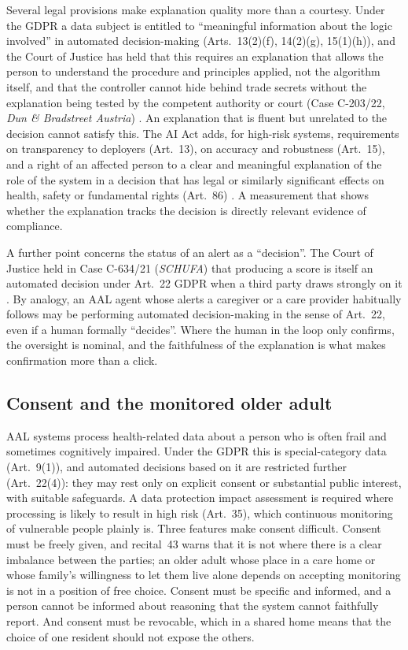 \documentclass[11pt,a4paper]{article}
\begin{document}
Several legal provisions make explanation quality more than a courtesy. Under the GDPR a data subject is entitled to ``meaningful information about the logic involved'' in automated decision-making (Arts.~13(2)(f), 14(2)(g), 15(1)(h)), and the Court of Justice has held that this requires an explanation that allows the person to understand the procedure and principles applied, not the algorithm itself, and that the controller cannot hide behind trade secrets without the explanation being tested by the competent authority or court (Case C-203/22, \emph{Dun \& Bradstreet Austria}) \cite{cjeu_dnb}. An explanation that is fluent but unrelated to the decision cannot satisfy this. The AI Act adds, for high-risk systems, requirements on transparency to deployers (Art.~13), on accuracy and robustness (Art.~15), and a right of an affected person to a clear and meaningful explanation of the role of the system in a decision that has legal or similarly significant effects on health, safety or fundamental rights (Art.~86) \cite{aiact}. A measurement that shows whether the explanation tracks the decision is directly relevant evidence of compliance.

A further point concerns the status of an alert as a ``decision''. The Court of Justice held in Case C-634/21 (\emph{SCHUFA}) that producing a score is itself an automated decision under Art.~22 GDPR when a third party draws strongly on it \cite{cjeu_schufa}. By analogy, an AAL agent whose alerts a caregiver or a care provider habitually follows may be performing automated decision-making in the sense of Art.~22, even if a human formally ``decides''. Where the human in the loop only confirms, the oversight is nominal, and the faithfulness of the explanation is what makes confirmation more than a click.

\subsection{Consent and the monitored older adult}
AAL systems process health-related data about a person who is often frail and sometimes cognitively impaired. Under the GDPR this is special-category data (Art.~9(1)), and automated decisions based on it are restricted further (Art.~22(4)): they may rest only on explicit consent or substantial public interest, with suitable safeguards. A data protection impact assessment is required where processing is likely to result in high risk (Art.~35), which continuous monitoring of vulnerable people plainly is. Three features make consent difficult. Consent must be freely given, and recital~43 warns that it is not where there is a clear imbalance between the parties; an older adult whose place in a care home or whose family's willingness to let them live alone depends on accepting monitoring is not in a position of free choice. Consent must be specific and informed, and a person cannot be informed about reasoning that the system cannot faithfully report. And consent must be revocable, which in a shared home means that the choice of one resident should not expose the others.
\end{document}
